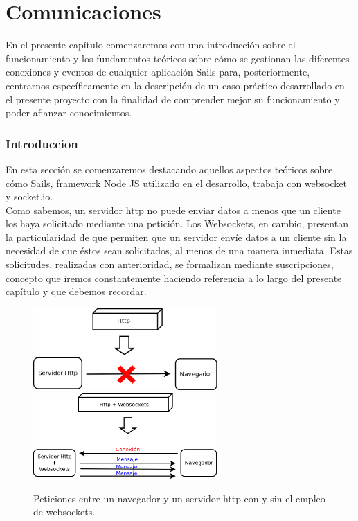 
\newpage

\chapter{Comunicaciones}
\label{chap:robot}


En el presente capítulo comenzaremos con una introducción sobre el funcionamiento y los fundamentos teóricos sobre cómo se gestionan las diferentes conexiones y eventos de cualquier aplicación
Sails para, posteriormente, centrarnos específicamente en la descripción de un caso práctico desarrollado en el presente proyecto con la finalidad de comprender mejor su funcionamiento y poder afianzar
conocimientos.


\subsection{Introduccion}
\label{sec:fundamentos}

En esta sección se comenzaremos destacando aquellos aspectos teóricos sobre cómo Sails, framework Node JS utilizado en el desarrollo, trabaja con websocket y socket.io.\\

Como sabemos, un servidor http no puede enviar datos a menos que un cliente los haya solicitado mediante una petición. Los Websockets, en cambio, presentan la particularidad de que
permiten que un servidor envíe datos a un cliente sin la necesidad de que éstos sean solicitados, al menos de una manera inmediata. Estas solicitudes, realizadas con anterioridad, se formalizan mediante suscripciones, concepto que 
iremos constantemente haciendo referencia a lo largo del presente capítulo y que debemos recordar.\\


\begin{figure}%
    \centering
    \includegraphics[width=7cm]{diagramas/http-weboscket.png}
    \qquad
    \includegraphics[width=7cm]{diagramas/http+weboscket.png}
    \caption{Peticiones entre un navegador y un servidor http con y sin el empleo de websockets.}%
    \label{fig:http-request}%
\end{figure}

